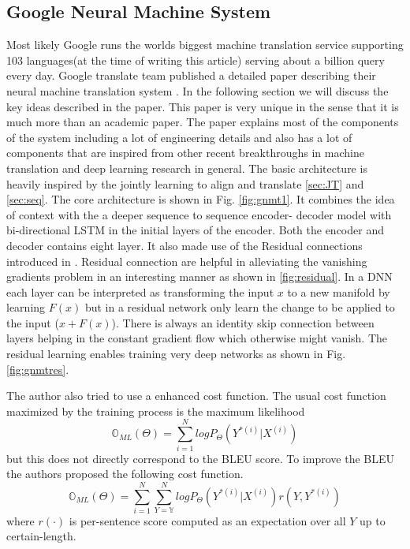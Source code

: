 \documentclass[a4paper]{article}
\begin{document}
\subsection{Google Neural Machine System}
Most  likely  Google  runs   the  worlds  biggest  machine  translation  service
supporting  103 languages(at the time of writing this article)  serving  about a
billion  query  every day. Google  translate  team  published  a  detailed paper
describing their neural machine translation  system \cite{wu2016google}. In  the
following section we  will discuss  the key  ideas described in the  paper. This
paper is  very unique in the sense that it is much more than an  academic paper.
The  paper explains  most of the components of  the  system  including a lot  of
engineering  details and  also has a lot  of  components  that are inspired from
other recent breakthroughs in machine translation and  deep learning research in
general.  The basic architecture is heavily inspired by the jointly  learning to
align and  translate  \ref{sec:JT}  and  \ref{sec:seq}. The core architecture is
shown in Fig. \ref{fig:gnmt1}. It combines the idea of context with the a deeper
sequence  to sequence  encoder- decoder  model with bi-directional LSTM  in  the
initial layers  of  the  encoder. Both  the  encoder  and decoder contains eight
layer.  It   also   made  use  of  the  Residual   connections   introduced   in
\cite{he2016deep}. Residual connection  are helpful in alleviating the vanishing
gradients problem in an interesting manner  as shown in \ref{fig:residual}. In a
DNN  each  layer  can  be  interpreted as transforming  the  input  $x$ to a new
manifold by learning  $F(x)$  but in a residual network only learn the change to
be  applied to  the  input  ($x  +  F(x)$).  There  is always an  identity  skip
connection between layers helping in the constant gradient  flow which otherwise
might vanish. The residual learning enables training very deep networks as shown
in Fig. \ref{fig:gnmtres}.

The author  also tried to use a enhanced  cost function. The usual cost function
maximized    by    the   training    process    is   the   maximum    likelihood
$$\mathbb{O}_{ML}(\Theta) = \sum_{i=1}^N log P_\Theta(Y^{*(i)} | X^{(i)}) $$ but
this does not directly correspond to  the BLEU score. To improve  the  BLEU  the
authors  proposed  the  following cost  function.  $$ \mathbb{O}_{ML}(\Theta)  =
\sum_{i=1}^N  \sum_{Y=\mathbb{Y}}^N   log  P_\Theta(Y^{*(i)}   |  X^{(i)})  r(Y,
Y^{*(i)} ) $$ where  $r(\cdot)$ is per-sentence score  computed as
an expectation over all $Y$ up to certain-length.
\end{document}
